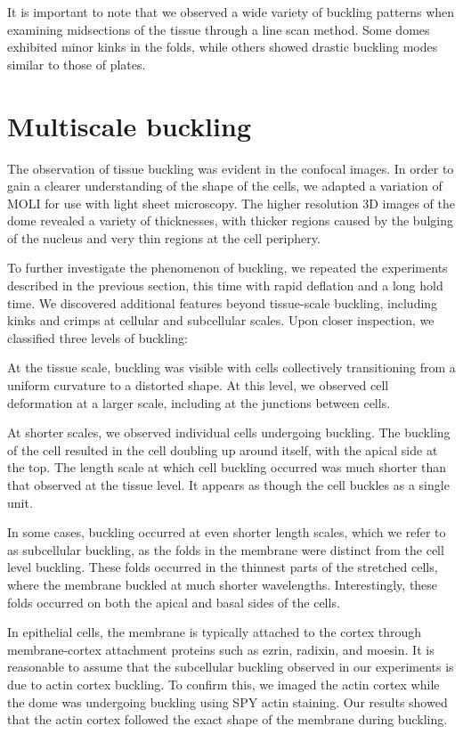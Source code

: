 It is important to note that we observed a wide variety of buckling
patterns when examining midsections of the tissue through a line scan
method. Some domes exhibited minor kinks in the folds, while others
showed drastic buckling modes similar to those of plates.

\hypertarget{multiscale-buckling}{%
	\section{Multiscale buckling}\label{multiscale-buckling}}

The observation of tissue buckling was evident in the confocal images.
In order to gain a clearer understanding of the shape of the cells, we
adapted a variation of MOLI for use with light sheet microscopy. The
higher resolution 3D images of the dome revealed a variety of
thicknesses, with thicker regions caused by the bulging of the nucleus
and very thin regions at the cell periphery.

To further investigate the phenomenon of buckling, we repeated the
experiments described in the previous section, this time with rapid
deflation and a long hold time. We discovered additional features beyond
tissue-scale buckling, including kinks and crimps at cellular and
subcellular scales. Upon closer inspection, we classified three levels
of buckling:

At the tissue scale, buckling was visible with cells collectively
transitioning from a uniform curvature to a distorted shape. At this
level, we observed cell deformation at a larger scale, including at the
junctions between cells.

At shorter scales, we observed individual cells undergoing buckling. The
buckling of the cell resulted in the cell doubling up around itself,
with the apical side at the top. The length scale at which cell buckling
occurred was much shorter than that observed at the tissue level. It
appears as though the cell buckles as a single unit.

In some cases, buckling occurred at even shorter length scales, which we
refer to as subcellular buckling, as the folds in the membrane were
distinct from the cell level buckling. These folds occurred in the
thinnest parts of the stretched cells, where the membrane buckled at
much shorter wavelengths. Interestingly, these folds occurred on both
the apical and basal sides of the cells.

In epithelial cells, the membrane is typically attached to the cortex
through membrane-cortex attachment proteins such as ezrin, radixin, and
moesin. It is reasonable to assume that the subcellular buckling
observed in our experiments is due to actin cortex buckling. To confirm
this, we imaged the actin cortex while the dome was undergoing buckling
using SPY actin staining. Our results showed that the actin cortex
followed the exact shape of the membrane during buckling.

